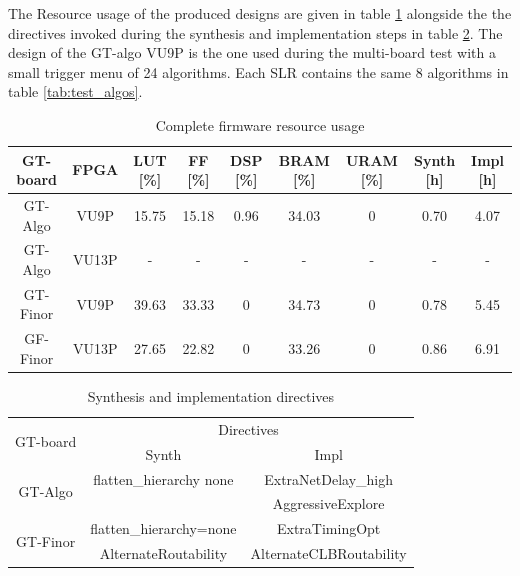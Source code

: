 \documentclass[../main.tex]{subfiles}
\begin{document}
The Resource usage of the produced designs are given in table \ref{tab:Design-impl} alongside the the directives invoked during the synthesis and implementation steps in table \ref{tab:Design-directivesl}. The design of the GT-algo VU9P is the one used during the multi-board test with a small trigger menu of 24 algorithms. Each SLR contains the same 8 algorithms in table \ref{tab:test_algos}.
\begin{table}[h]
    \centering
    \begin{tabular}{c|c|c|c|c|c|c|c|c}
        GT-board & FPGA & LUT [\%] & FF [\%] & DSP [\%] & BRAM [\%] & URAM [\%] & Synth [h] & Impl [h] \\
        \hline
        GT-Algo   & VU9P  & 15.75 & 15.18 & 0.96 & 34.03 & 0 & 0.70 & 4.07  \\
        GT-Algo   & VU13P & - & - & - & - & - & - & -  \\
        GT-Finor  & VU9P  & 39.63 & 33.33 & 0 & 34.73 & 0 & 0.78 & 5.45  \\
        GF-Finor  & VU13P & 27.65 & 22.82 & 0 & 33.26 & 0 & 0.86 & 6.91  \\
    \end{tabular}
    \caption{Complete firmware resource usage}
    \label{tab:Design-impl}
\end{table}

\begin{table}[h]
    \centering
    \begin{tabular}{c|c|c}
        \multirow{2}{*}{GT-board} & \multicolumn{2}{c}{Directives} \\
        & Synth & Impl \\
        \hline
        \multirow{2}{*}{GT-Algo}    & flatten\_hierarchy none &  ExtraNetDelay\_high \\
           &  & AggressiveExplore  \\
        \hline
        \multirow{2}{*}{GT-Finor}  & flatten\_hierarchy=none & ExtraTimingOpt  \\
           &  AlternateRoutability & AlternateCLBRoutability \\
    \end{tabular}
    \caption{Synthesis and implementation directives}
    \label{tab:Design-directivesl}
\end{table}
    
\end{document}
